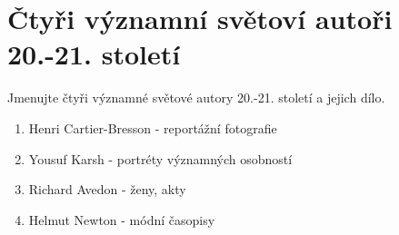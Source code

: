 \section{Čtyři významní světoví autoři 20.-21. století}
Jmenujte čtyři významné světové autory 20.-21. století a jejich dílo.
\begin{enumerate}
    \item Henri Cartier-Bresson - reportážní fotografie
    \item Yousuf Karsh - portréty významných osobností
    \item Richard Avedon - ženy, akty
    \item Helmut Newton - módní časopisy
\end{enumerate}
